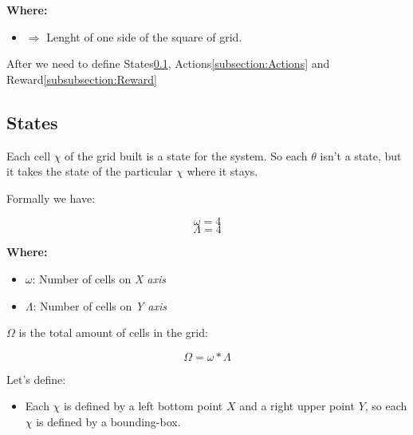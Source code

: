 \documentclass[12pt]{article}
\begin{document}
\textbf{Where:} 

\begin{itemize}

\item {\color{green}{$h$}} $\Rightarrow$ Lenght of one side of the square of grid.

\end{itemize}

After we need to define States\ref{subsection:States}, Actions\ref{subsection:Actions} and Reward\ref{subsubsection:Reward}

\subsection{States}
\label{subsection:States}

Each cell $\chi$ of the grid built is a state for the system. So each $\theta$ isn't a state, but it takes the state of the particular $\chi$ where it stays.

Formally we have:

\[
\omega = 4
\]
\[
\Lambda = 4
\]

\textbf{Where:}

\begin{itemize}

    \item $\omega$: Number of cells on \textit{X axis}

    \item $\Lambda$: Number of cells on \textit{Y axis}

\end{itemize}
$\Omega$ is the total amount of cells in the grid:

\[
\Omega = \omega * \Lambda
\]

Let's define:

\begin{itemize}

    \item Each $\chi$ is defined by a left bottom point $X$ and a right upper point $Y$, so each $\chi$ is defined by a bounding-box.
    
\end{itemize}

    
\end{document}
